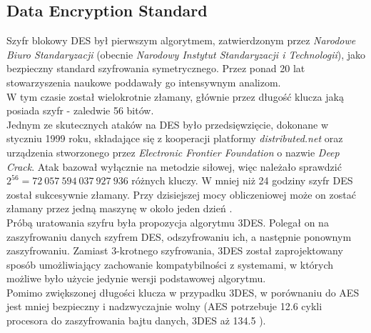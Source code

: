\subsection{Data Encryption Standard}
Szyfr blokowy DES był pierwszym algorytmem, zatwierdzonym przez \textit{Narodowe Biuro Standaryzacji} 
(obecnie \textit{Narodowy Instytut Standaryzacji i Technologii}), jako bezpieczny standard szyfrowania symetrycznego.
Przez ponad 20 lat stowarzyszenia naukowe poddawały go intensywnym analizom. \\
W tym czasie został wielokrotnie złamany, głównie przez długość klucza jaką posiada szyfr - zaledwie 56 bitów. \\
Jednym ze skutecznych ataków na DES było przedsięwzięcie, dokonane w styczniu 1999 roku, składające się z kooperacji platformy \textit{distributed.net} 
oraz urządzenia stworzonego przez \textit{Electronic Frontier Foundation} o nazwie \textit{Deep Crack}. 
Atak bazował wyłącznie na metodzie siłowej, więc należało sprawdzić $2^{56} = 72\ 057\ 594\ 037\ 927\ 936$ różnych kluczy.
W mniej niż 24 godziny szyfr DES został sukcesywnie złamany. 
Przy dzisiejszej mocy obliczeniowej może on zostać złamany przez jedną maszynę w około jeden dzień \cite{desday}. \\
Próbą uratowania szyfru była propozycja algorytmu 3DES. 
Polegał on na zaszyfrowaniu danych szyfrem DES, odszyfrowaniu ich, a następnie ponownym zaszyfrowaniu. 
Zamiast 3-krotnego szyfrowania, 3DES został zaprojektowany sposób umożliwiający zachowanie kompatybilności z systemami, w których możliwe było użycie jedynie wersji podstawowej algorytmu. \\
Pomimo zwiększonej długości klucza w przypadku 3DES, w porównaniu do AES jest mniej bezpieczny i nadzwyczajnie wolny (AES potrzebuje 12.6 cykli procesora do zaszyfrowania bajtu danych, 3DES aż 134.5 \cite{crypto101}).

